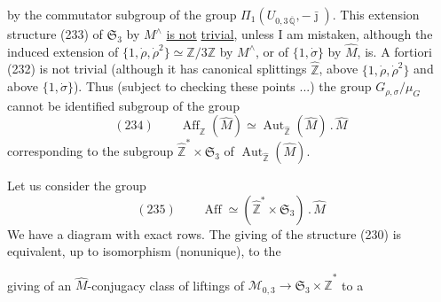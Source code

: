 

by the  commutator subgroup
of the group $\Pi_1(U_{0,3\,\overline{\mathbb Q}},-\bar{\jmath})$.
This  extension structure (233) of $\mathfrak S_3$
by $M^\wedge$ \uline{is not} \uline{trivial}, unless I am mistaken,
although the induced extension of
$\{1,\dot\rho,\dot\rho^2\}\simeq\mathbb Z/3\mathbb Z$ by $M^\wedge$,
or of $\{1,\dot\sigma\}$ by $\widehat M$, is.
A fortiori (232) is not trivial (although it has canonical
splittings  $\widehat{\mathbb Z}$, above
$\{1,\dot\rho,\dot\rho^2\}$ and above $\{1,\dot\sigma\}$).
Thus (subject to checking these points ...)
the group $G_{\rho,\sigma}/\mu_G$ cannot be identified
 subgroup of the  group
\[
(234)\qquad
\boxed{\operatorname{Aff}_{\widehat{\mathbb Z}}(\widehat M)
\simeq\operatorname{Aut}_{\widehat{\mathbb Z}}(\widehat M)\mathbin{.}\widehat M}
\]
corresponding to the subgroup $\widehat{\mathbb Z}^{*}\times\mathfrak S_3$
of $\operatorname{Aut}_{\widehat{\mathbb Z}}(\widehat M)$.

 Let us consider the group
\[
(235)\qquad
\operatorname{Aff}\simeq
(\widehat{\mathbb Z}^{*}\times\mathfrak S_3)\mathbin{.}\widehat M
\]
We have a diagram
with exact rows. The giving of the structure (230) is equivalent,
up to isomorphism (nonunique), to the



giving of an $\widehat M$-conjugacy class of liftings
of $\mathcal M_{0,3}\longrightarrow\mathfrak S_3\times\widehat{\mathbb Z}^{*}$
to a

